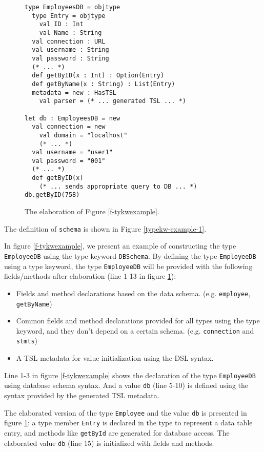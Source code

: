 \documentclass{sig-alternate}
\newcommand{\mycaption}[1]{\vspace{-4px}\caption{#1}\vspace{-2px}}
\begin{document}
\begin{figure}[t]
\begin{lstlisting}[style=wyvern]
type EmployeesDB = objtype
  type Entry = objtype
    val ID : Int
    val Name : String 
  val connection : URL
  val username : String
  val password : String
  (* ... *)
  def getByID(x : Int) : Option(Entry)
  def getByName(x : String) : List(Entry)
  metadata = new : HasTSL
    val parser = (* ... generated TSL ... *)

let db : EmployeesDB = new
  val connection = new
    val domain = "localhost"
    (* ... *)
  val username = "user1"
  val password = "001"
  (* ... *)
  def getByID(x)
    (* ... sends appropriate query to DB ... *)
db.getByID(758)
\end{lstlisting}
\mycaption{The elaboration of Figure \ref{f-tykwexample}.}
\label{typekw-example-2}
\end{figure}

The definition of \verb|schema| is shown in Figure \ref{typekw-example-1}. 

In figure \ref{f-tykwexample}, we present an example of constructing the type \verb|EmployeeDB| using the type keyword \verb|DBSchema|. By defining the type \verb|EmployeeDB| using a type keyword, the type \verb|EmployeeDB| will be provided with the following fields/methods after elaboration (line 1-13 in figure \ref{typekw-example-2}):
\begin{itemize}\setlength{\itemsep}{0pt}
\item Fields and method declarations based on the data schema. (e.g. \verb|employee|, \verb|getByName|)
\item Common fields and method declarations provided for all types using the type keyword, and they don't depend on a certain schema. (e.g. \verb|connection| and \verb|stmts|)
\item A TSL metadata for value initialization using the DSL syntax.
\end{itemize}

Line 1-3 in figure \ref{f-tykwexample} shows the declaration of the type \verb|EmployeeDB| using database schema syntax. And a value \verb|db| (line 5-10) is defined using the syntax provided by the generated TSL metadata. 

The elaborated version of the type \verb|Employee| and the value \verb|db| is presented in figure \ref{typekw-example-2}: a type member \verb|Entry| is declared in the type to represent a data table entry, and methods like \verb|getById| are generated for database access. The elaborated value \verb|db| (line 15) is initialized with fields and methods.
\end{document}
